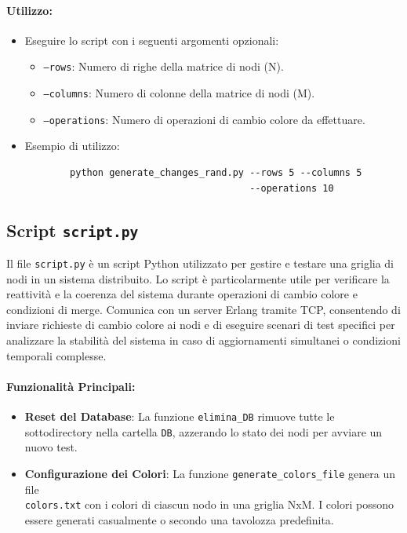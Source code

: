 \documentclass[12pt, a4paper]{report}
\begin{document}
\paragraph{Utilizzo:}
\begin{itemize}
    \item Eseguire lo script con i seguenti argomenti opzionali:
        \begin{itemize}
            \item \texttt{--rows}: Numero di righe della matrice di nodi (N).
            \item \texttt{--columns}: Numero di colonne della matrice di nodi (M).
            \item \texttt{--operations}: Numero di operazioni di cambio colore da effettuare.
        \end{itemize}
    \item Esempio di utilizzo:
    \begin{verbatim}
        python generate_changes_rand.py --rows 5 --columns 5 
                                        --operations 10
    \end{verbatim}
\end{itemize}

\subsection{Script \texttt{script.py}}\label{sec:script}

Il file \texttt{script.py} è un script Python utilizzato per gestire e testare una griglia di nodi in un sistema distribuito. Lo script è particolarmente utile per verificare la reattività e la coerenza del sistema durante operazioni di cambio colore e condizioni di merge. Comunica con un server Erlang tramite TCP, consentendo di inviare richieste di cambio colore ai nodi e di eseguire scenari di test specifici per analizzare la stabilità del sistema in caso di aggiornamenti simultanei o condizioni temporali complesse.

\paragraph{Funzionalità Principali:}
\begin{itemize}
    \item \textbf{Reset del Database}: La funzione \texttt{elimina\_DB} rimuove tutte le sottodirectory nella cartella \texttt{DB}, azzerando lo stato dei nodi per avviare un nuovo test.
    \item \textbf{Configurazione dei Colori}: La funzione \texttt{generate\_colors\_file} genera un file \\
    \texttt{colors.txt} con i colori di ciascun nodo in una griglia NxM. I colori possono essere generati casualmente o secondo una tavolozza predefinita.
\end{itemize}
\end{document}
